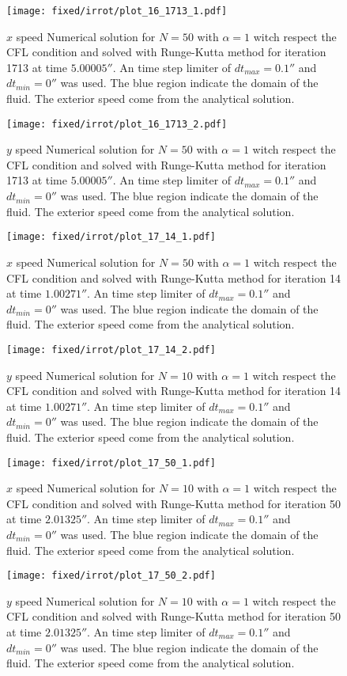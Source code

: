 \begin{figure}
\texttt{[image: fixed/irrot/plot\_16\_1713\_1.pdf]}
\caption{$x$ speed Numerical solution for $N=50$ with $\alpha=1$ witch respect the CFL condition and solved with Runge-Kutta method
for iteration 1713 at time $\unit{5.00005}{\second}$.
An time step limiter of $dt_{max}=\unit{0.1}{\second}$ and $dt_{min}=\unit{0}{\second}$ was used.
The blue region indicate the domain of the fluid. The exterior speed come from the analytical solution.
}
\end{figure}
\begin{figure}
\texttt{[image: fixed/irrot/plot\_16\_1713\_2.pdf]}
\caption{$y$ speed Numerical solution for $N=50$ with $\alpha=1$ witch respect the CFL condition and solved with Runge-Kutta method
for iteration 1713 at time $\unit{5.00005}{\second}$.
An time step limiter of $dt_{max}=\unit{0.1}{\second}$ and $dt_{min}=\unit{0}{\second}$ was used.
The blue region indicate the domain of the fluid. The exterior speed come from the analytical solution.
}
\end{figure}

\begin{figure}
\texttt{[image: fixed/irrot/plot\_17\_14\_1.pdf]}
\caption{$x$ speed Numerical solution for $N=50$ with $\alpha=1$ witch respect the CFL condition and solved with Runge-Kutta method
for iteration 14 at time $\unit{1.00271}{\second}$.
An time step limiter of $dt_{max}=\unit{0.1}{\second}$ and $dt_{min}=\unit{0}{\second}$ was used.
The blue region indicate the domain of the fluid. The exterior speed come from the analytical solution.
}
\end{figure}
\begin{figure}
\texttt{[image: fixed/irrot/plot\_17\_14\_2.pdf]}
\caption{$y$ speed Numerical solution for $N=10$ with $\alpha=1$ witch respect the CFL condition and solved with Runge-Kutta method
for iteration 14 at time $\unit{1.00271}{\second}$.
An time step limiter of $dt_{max}=\unit{0.1}{\second}$ and $dt_{min}=\unit{0}{\second}$ was used.
The blue region indicate the domain of the fluid. The exterior speed come from the analytical solution.
}
\end{figure}

\begin{figure}
\texttt{[image: fixed/irrot/plot\_17\_50\_1.pdf]}
\caption{$x$ speed Numerical solution for $N=10$ with $\alpha=1$ witch respect the CFL condition and solved with Runge-Kutta method
for iteration 50 at time $\unit{2.01325}{\second}$.
An time step limiter of $dt_{max}=\unit{0.1}{\second}$ and $dt_{min}=\unit{0}{\second}$ was used.
The blue region indicate the domain of the fluid. The exterior speed come from the analytical solution.
}
\end{figure}
\begin{figure}
\texttt{[image: fixed/irrot/plot\_17\_50\_2.pdf]}
\caption{$y$ speed Numerical solution for $N=10$ with $\alpha=1$ witch respect the CFL condition and solved with Runge-Kutta method
for iteration 50 at time $\unit{2.01325}{\second}$.
An time step limiter of $dt_{max}=\unit{0.1}{\second}$ and $dt_{min}=\unit{0}{\second}$ was used.
The blue region indicate the domain of the fluid. The exterior speed come from the analytical solution.
}
\end{figure}

